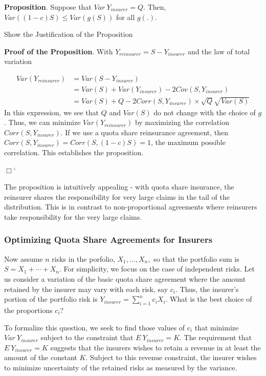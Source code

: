 \documentclass[]{book}
\theoremstyle{definition}
\theoremstyle{definition}
\theoremstyle{definition}
\theoremstyle{remark}
\begin{document}
\textbf{Proposition}. Suppose that \(Var~Y_{insurer}=Q.\) Then,
\(Var ((1-c)S) \le Var(g(S))\) for all \(g(.)\).

Show the Justification of the Proposition

\hypertarget{toggleProof}{}
\textbf{Proof of the Proposition}. With
\(Y_{reinsurer} = S - Y_{insurer}\) and the law of total variation

\[
\begin{array}{ll}
Var (Y_{reinsurer}) &= Var (S-Y_{insurer}) \\
&= Var (S) + Var (Y_{insurer})  - 2 Cov (S,Y_{insurer}) \\
&=Var (S) + Q - 2 Corr (S,Y_{insurer}) \times \sqrt{Q} \sqrt{Var (S)}
\end{array}
\] In this expression, we see that \(Q\) and \(Var(S)\) do not change
with the choice of \(g\). Thus, we can minimize \(Var (Y_{reinsurer})\)
by maximizing the correlation \(Corr (S,Y_{insurer})\). If we use a
quota share reinsurance agreement, then
\(Corr (S,Y_{insurer})=Corr (S,(1-c)S)=1\), the maximum possible
correlation. This establishes the proposition.

\(\Box\)`

The proposition is intuitively appealing - with quota share insurance,
the reinsurer shares the responsibility for very large claims in the
tail of the distribution. This is in contrast to non-proportional
agreements where reinsurers take responsibility for the very large
claims.

\subsubsection{Optimizing Quota Share Agreements for
Insurers}\label{optimizing-quota-share-agreements-for-insurers}

Now assume \(n\) risks in the porfolio, \(X_1, \ldots, X_n,\) so that
the portfolio sum is \(S= X_1 + \cdots + X_n\). For simplicity, we focus
on the case of independent risks. Let us consider a variation of the
basic quota share agreement where the amount retained by the insurer may
vary with each risk, say \(c_i\). Thus, the insurer's portion of the
portfolio risk is \(Y_{insurer} = \sum_{i=1}^n c_i X_i\). What is the
best choice of the proportions \(c_i\)?

To formalize this question, we seek to find those values of \(c_i\) that
minimize \(Var ~Y_{insurer}\) subject to the constraint that
\(E ~Y_{insurer} = K.\) The requirement that \(E ~Y_{insurer} = K\)
suggests that the insurers wishes to retain a revenue in at least the
amount of the constant \(K\). Subject to this revenue constraint, the
insurer wishes to minimize uncertainty of the retained risks as measured
by the variance.
\end{document}
